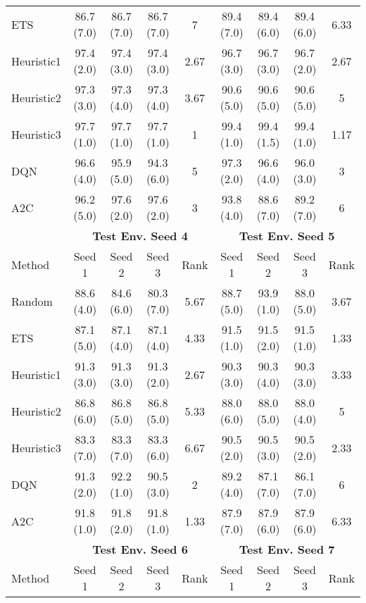 \begin{table}[t]
{\begin{tabular}{lcccccccc}
ETS        & 86.7 (7.0)  & 86.7 (7.0)  & 86.7 (7.0) & 7    & 89.4 (7.0)  & 89.4 (6.0)  & 89.4 (6.0) & 6.33 \\
Heuristic1 & 97.4 (2.0)  & 97.4 (3.0)  & 97.4 (3.0) & 2.67 & 96.7 (3.0)  & 96.7 (3.0)  & 96.7 (2.0) & 2.67 \\
Heuristic2 & 97.3 (3.0)  & 97.3 (4.0)  & 97.3 (4.0) & 3.67 & 90.6 (5.0)  & 90.6 (5.0)  & 90.6 (5.0) & 5    \\
Heuristic3 & 97.7 (1.0)  & 97.7 (1.0)  & 97.7 (1.0) & 1    & 99.4 (1.0)  & 99.4 (1.5)  & 99.4 (1.0) & 1.17 \\
DQN        & 96.6 (4.0)  & 95.9 (5.0)  & 94.3 (6.0) & 5    & 97.3 (2.0)  & 96.6 (4.0)  & 96.0 (3.0) & 3    \\
A2C        & 96.2 (5.0)  & 97.6 (2.0)  & 97.6 (2.0) & 3    & 93.8 (4.0)  & 88.6 (7.0)  & 89.2 (7.0) & 6    \\ \midrule
\textbf{}  & \multicolumn{4}{c}{\textbf{Test Env. Seed 4}} & \multicolumn{4}{c}{\textbf{Test Env. Seed 5}} \\
    \cmidrule(lr){2-5} \cmidrule(lr){6-9} 
Method     & Seed 1      & Seed 2      & Seed 3     & Rank & Seed 1      & Seed 2      & Seed 3     & Rank \\ \midrule
Random     & 88.6 (4.0)  & 84.6 (6.0)  & 80.3 (7.0) & 5.67 & 88.7 (5.0)  & 93.9 (1.0)  & 88.0 (5.0) & 3.67 \\
ETS        & 87.1 (5.0)  & 87.1 (4.0)  & 87.1 (4.0) & 4.33 & 91.5 (1.0)  & 91.5 (2.0)  & 91.5 (1.0) & 1.33 \\
Heuristic1 & 91.3 (3.0)  & 91.3 (3.0)  & 91.3 (2.0) & 2.67 & 90.3 (3.0)  & 90.3 (4.0)  & 90.3 (3.0) & 3.33 \\
Heuristic2 & 86.8 (6.0)  & 86.8 (5.0)  & 86.8 (5.0) & 5.33 & 88.0 (6.0)  & 88.0 (5.0)  & 88.0 (4.0) & 5    \\
Heuristic3 & 83.3 (7.0)  & 83.3 (7.0)  & 83.3 (6.0) & 6.67 & 90.5 (2.0)  & 90.5 (3.0)  & 90.5 (2.0) & 2.33 \\
DQN        & 91.3 (2.0)  & 92.2 (1.0)  & 90.5 (3.0) & 2    & 89.2 (4.0)  & 87.1 (7.0)  & 86.1 (7.0) & 6    \\
A2C        & 91.8 (1.0)  & 91.8 (2.0)  & 91.8 (1.0) & 1.33 & 87.9 (7.0)  & 87.9 (6.0)  & 87.9 (6.0) & 6.33 \\ \midrule
\textbf{}  & \multicolumn{4}{c}{\textbf{Test Env. Seed 6}} & \multicolumn{4}{c}{\textbf{Test Env. Seed 7}} \\
    \cmidrule(lr){2-5} \cmidrule(lr){6-9} 
Method     & Seed 1      & Seed 2      & Seed 3     & Rank & Seed 1      & Seed 2      & Seed 3     & Rank \\ \midrule

\end{tabular}}
\end{table}
